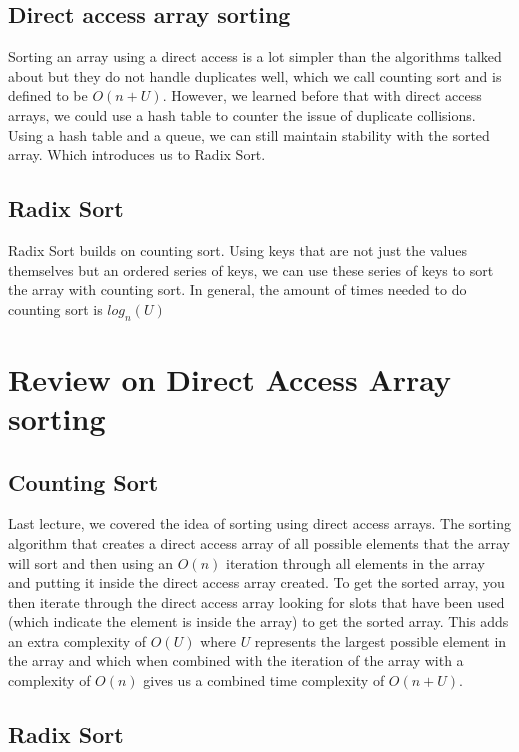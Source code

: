 \documentclass[11pt,a4paper,english]{report}
\begin{document}
\subsection{Direct access array sorting}

Sorting an array using a direct access is a lot simpler than the algorithms talked about but they do not handle duplicates well, which we call counting sort and is defined to be $O(n + U)$. However, we learned before that with direct access arrays, we could use a hash table to counter the issue of duplicate collisions. Using a hash table and a queue, we can still maintain stability with the sorted array. Which introduces us to Radix Sort.

\subsection{Radix Sort}

Radix Sort builds on counting sort. Using keys that are not just the values themselves but an ordered series of keys, we can use these series of keys to sort the array with counting sort. In general, the amount of times needed to do counting sort is $log_{n}{(U)}$


\section{Review on Direct Access Array sorting}

\subsection{Counting Sort}
Last lecture, we covered the idea of sorting using direct access arrays. The sorting algorithm that creates a direct access array of all possible elements that the array will sort and then using an $O(n)$ iteration through all elements in the array and putting it inside the direct access array created. To get the sorted array, you then iterate through the direct access array looking for slots that have been used (which indicate the element is inside the array) to get the sorted array. This adds an extra complexity of $O(U)$ where $U$ represents the largest possible element in the array and which when combined with the iteration of the array with a complexity of $O(n)$ gives us a combined time complexity of $O(n + U)$.

\subsection{Radix Sort}
\end{document}
